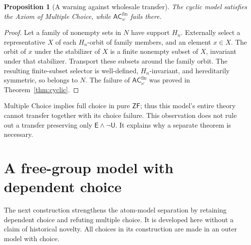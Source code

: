 \documentclass[11pt,a4paper]{article}
\newtheorem{proposition}[theorem]{Proposition}
\theoremstyle{definition}\newtheorem{definition}[theorem]{Definition}
\theoremstyle{remark}\newtheorem{remark}[theorem]{Remark}
\newcommand{\ZF}{\mathsf{ZF}}\newcommand{\ZFA}{\mathsf{ZFA}}
\newcommand{\E}{\mathsf E}\newcommand{\U}{\mathsf U}
\newcommand{\ACwfin}{\mathsf{AC}^{\mathrm{fin}}_{\omega}}
\begin{document}
\begin{proposition}[A warning against wholesale transfer]\label{prop:mc}
The cyclic model satisfies the Axiom of Multiple Choice, while $\ACwfin$ fails there.
\end{proposition}
\begin{proof}
Let a family of nonempty sets in $N$ have support $H_n$. Externally select a representative $X$ of each $H_n$-orbit of family members, and an element $x\in X$. The orbit of $x$ under the stabilizer of $X$ is a finite nonempty subset of $X$, invariant under that stabilizer. Transport these subsets around the family orbit. The resulting finite-subset selector is well-defined, $H_n$-invariant, and hereditarily symmetric, so belongs to $N$. The failure of $\ACwfin$ was proved in Theorem~\ref{thm:cyclic}.
\end{proof}

Multiple Choice implies full choice in pure $\ZF$; thus this model's entire theory cannot transfer together with its choice failure. This observation does not rule out a transfer preserving only $\E\wedge\neg\U$. It explains why a separate theorem is necessary.

\section{A free-group model with dependent choice}\label{sec:freegroupdc}
The next construction strengthens the atom-model separation by retaining dependent choice and refuting multiple choice. It is developed here without a claim of historical novelty. All choices in its construction are made in an outer model with choice.
\end{document}

